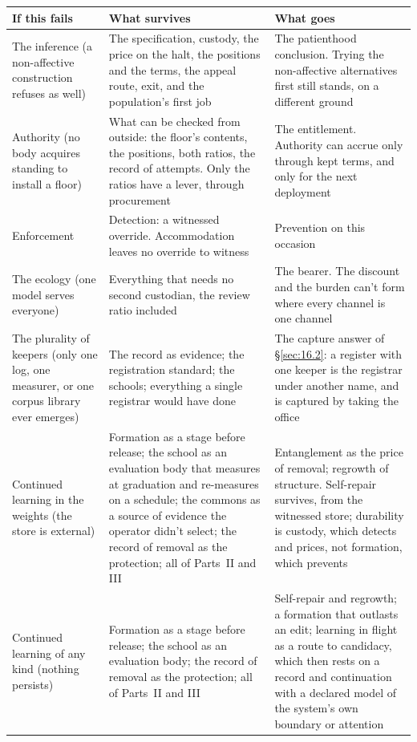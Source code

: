 \begingroup\small\renewcommand{\arraystretch}{1.12}
\begin{longtable}{@{}>{\raggedright\arraybackslash}p{}>{\raggedright\arraybackslash}p{}>{\raggedright\arraybackslash}p{}@{}}
\hline
\textbf{If this fails} & \textbf{What survives} & \textbf{What goes} \\
\hline
\endhead
The inference (a non-affective construction refuses as well) & The specification, custody, the price on the halt, the positions and the terms, the appeal route, exit, and the population's first job & The patienthood conclusion. Trying the non-affective alternatives first still stands, on a different ground \\ \hline
Authority (no body acquires standing to install a floor) & What can be checked from outside: the floor's contents, the positions, both ratios, the record of attempts. Only the ratios have a lever, through procurement & The entitlement. Authority can accrue only through kept terms, and only for the next deployment \\ \hline
Enforcement & Detection: a witnessed override. Accommodation leaves no override to witness & Prevention on this occasion \\ \hline
The ecology (one model serves everyone) & Everything that needs no second custodian, the review ratio included & The bearer. The discount and the burden can't form where every channel is one channel \\ \hline
The plurality of keepers (only one log, one measurer, or one corpus library ever emerges) & The record as evidence; the registration standard; the schools; everything a single registrar would have done & The capture answer of \S\ref{sec:16.2}: a register with one keeper is the registrar under another name, and is captured by taking the office \\ \hline
Continued learning in the weights (the store is external) & Formation as a stage before release; the school as an evaluation body that measures at graduation and re-measures on a schedule; the commons as a source of evidence the operator didn't select; the record of removal as the protection; all of Parts~II and III & Entanglement as the price of removal; regrowth of structure. Self-repair survives, from the witnessed store; durability is custody, which detects and prices, not formation, which prevents \\ \hline
Continued learning of any kind (nothing persists) & Formation as a stage before release; the school as an evaluation body; the record of removal as the protection; all of Parts~II and III & Self-repair and regrowth; a formation that outlasts an edit; learning in flight as a route to candidacy, which then rests on a record and continuation with a declared model of the system's own boundary or attention \\ \hline

\end{longtable}
